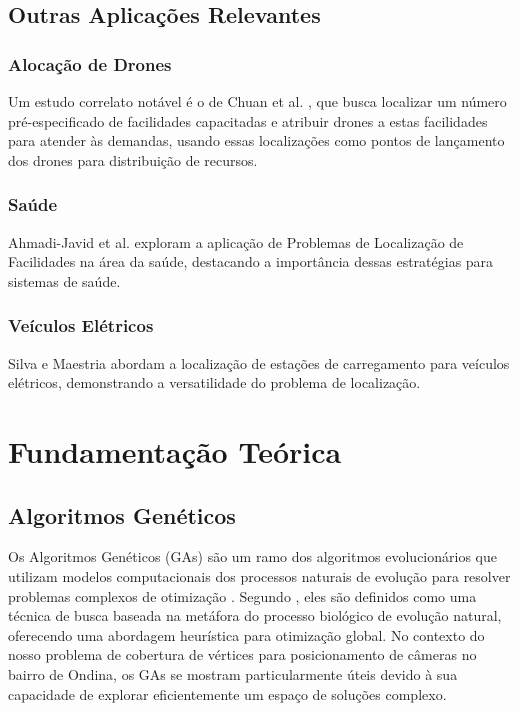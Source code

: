 \documentclass[12pt, a4paper]{report}
\begin{document}
\section{Outras Aplicações Relevantes}

\subsection{Alocação de Drones}
Um estudo correlato notável é o de Chuan et al. \cite{Chuan2019}, que busca localizar um número pré-especificado de facilidades capacitadas e atribuir drones a estas facilidades para atender às demandas, usando essas localizações como pontos de lançamento dos drones para distribuição de recursos.

\subsection{Saúde}
Ahmadi-Javid et al. \cite{AhmadiJavid2017} exploram a aplicação de Problemas de Localização de Facilidades na área da saúde, destacando a importância dessas estratégias para sistemas de saúde.

\subsection{Veículos Elétricos}
Silva e Maestria \cite{Silva2019} abordam a localização de estações de carregamento para veículos elétricos, demonstrando a versatilidade do problema de localização.

\chapter{Fundamentação Teórica}

\section{Algoritmos Genéticos}
Os Algoritmos Genéticos (GAs) são um ramo dos algoritmos evolucionários que utilizam modelos computacionais dos processos naturais de evolução para resolver problemas complexos de otimização \cite{Holland1975}. Segundo \cite{Linden2006}, eles são definidos como uma técnica de busca baseada na metáfora do processo biológico de evolução natural, oferecendo uma abordagem heurística para otimização global. No contexto do nosso problema de cobertura de vértices para posicionamento de câmeras no bairro de Ondina, os GAs se mostram particularmente úteis devido à sua capacidade de explorar eficientemente um espaço de soluções complexo.
\end{document}
